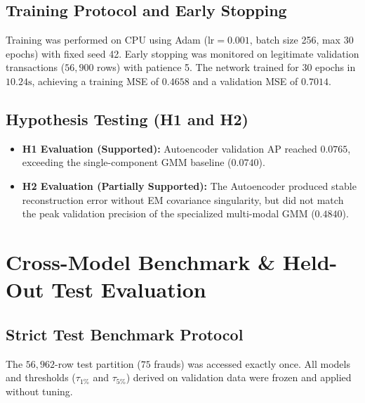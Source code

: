 \documentclass[conference]{IEEEtran}
\begin{document}
\subsection{Training Protocol and Early Stopping}
Training was performed on CPU using Adam ($\text{lr}=0.001$, batch size 256, max 30 epochs) with fixed seed 42. Early stopping was monitored on legitimate validation transactions ($56,900$ rows) with patience 5. The network trained for 30 epochs in $10.24\text{s}$, achieving a training MSE of $0.4658$ and a validation MSE of $0.7014$.

\subsection{Hypothesis Testing (H1 and H2)}
\begin{itemize}
    \item \textbf{H1 Evaluation (Supported):} Autoencoder validation AP reached $0.0765$, exceeding the single-component GMM baseline ($0.0740$).
    \item \textbf{H2 Evaluation (Partially Supported):} The Autoencoder produced stable reconstruction error without EM covariance singularity, but did not match the peak validation precision of the specialized multi-modal GMM ($0.4840$).
\end{itemize}

\section{Cross-Model Benchmark \& Held-Out Test Evaluation}
\subsection{Strict Test Benchmark Protocol}
The $56,962$-row test partition ($75$ frauds) was accessed exactly once. All models and thresholds ($\tau_{1\%}$ and $\tau_{5\%}$) derived on validation data were frozen and applied without tuning.
\end{document}
